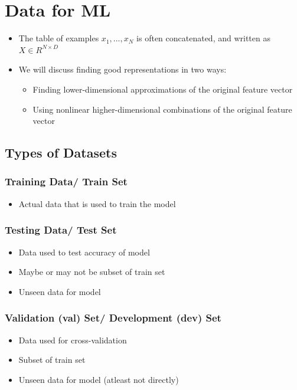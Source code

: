 \chapter{Data for ML}

\begin{itemize}
    \item The table of examples ${x_1, ..., x_N}$ is often concatenated, and written as $X \in R^{N \times D}$
    \item We will discuss finding good representations in two ways:
    \begin{itemize}
        \item Finding lower-dimensional approximations of the original feature vector
        \item Using nonlinear higher-dimensional combinations of the original feature vector
    \end{itemize}
\end{itemize}


\section{Types of Datasets}\label{Types of Datasets}

\subsection{Training Data/ Train Set}\label{data_train}
\begin{itemize}
    \item Actual data that is used to train the model
\end{itemize}

\subsection{Testing Data/ Test Set}\label{data_test}
\begin{itemize}
    \item Data used to test accuracy of model
    \item Maybe or may not be subset of train set
    \item Unseen data for model
\end{itemize}

\subsection{Validation (val) Set/ Development (dev) Set}\label{data_val_dev}
\begin{itemize}
    \item Data used for cross-validation
    \item Subset of train set
    \item Unseen data for model (atleast not directly)
\end{itemize}

